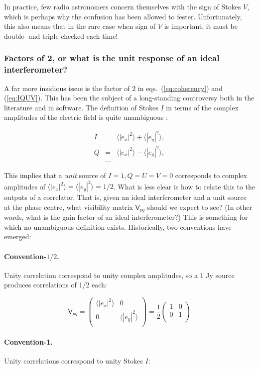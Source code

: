 \documentclass[]{aa}
\newcommand{\matrixtt}[4]{\left( \begin{array}{cc}#1&#2\\#3&#4\\\end{array} \right)}
\newcommand{\coh}[2]{\mathsf{{#1}}_{{#2}}}
\begin{document}
In practice, few radio astronomers concern themselves with the sign of Stokes $V$, which is perhaps why the confusion has been allowed to fester. Unfortunately, this also means that in the rare case when sign of $V$ is important, it
must be double- and triple-checked each time!

\subsubsection{\label{sec:factor2}Factors of 2, or what is the unit response of an ideal interferometer?}

A far more insidious issue is the factor of $2$ in eqs.~(\ref{eq:coherency}) and (\ref{eq:IQUV}). This has been the subject of a long-standing controversy both in the literature and in software. The definition of Stokes $I$ in terms of the complex amplitudes of the electric field is quite unambiguous \citep{tms,born-wolf}:

\begin{eqnarray*}
I&=&\langle |e_x|^2\rangle  + \langle |e_y|^2\rangle , \\
Q&=&\langle |e_x|^2\rangle  - \langle |e_y|^2\rangle , \\
&...&
\end{eqnarray*}

This implies that a {\em unit} source of $I=1, Q=U=V=0$ corresponds to complex amplitudes of $\langle |e_x|^2\rangle =\langle |e_y|^2\rangle = 1/2$. What is less clear is how to relate this to the outputs of a correlator. That is, given an ideal interferometer and a unit source at the phase centre, what visibility matrix $\coh{V}{pq}$ should we expect to see? (In other words, what is the gain factor of an ideal interferometer?) This is something for which no unambiguous definition exists. Historically, two conventions have emerged:

\paragraph{Convention-$\scriptstyle 1/2$.} Unity correlation correspond to unity complex amplitudes, so a 1 Jy source produces correlations of 1/2 each: 

\[
\coh{V}{pq} = \matrixtt{\langle |e_x|^2\rangle }{0}{0}{\langle |e_y|^2\rangle } = \frac{1}{2}\matrixtt{1}{0}{0}{1}
\]

\paragraph{Convention-1.} Unity correlations correspond to unity Stokes $I$:
\end{document}
